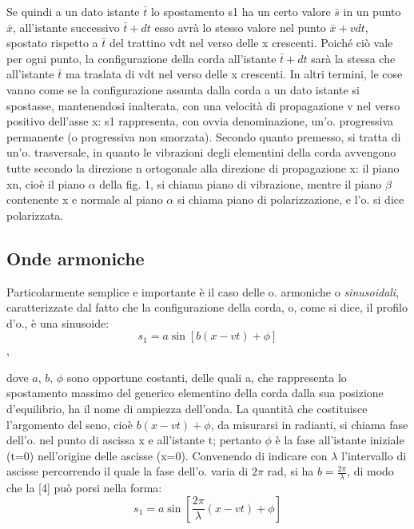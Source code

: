 \documentclass[a4paper]{article}
\begin{document}
Se quindi a un dato istante $\bar{t}$ lo spostamento s1 ha un certo valore $\bar{s}$ in un punto $\bar{x}$, all'istante successivo $\bar{t}+dt$ esso avrà lo stesso valore nel punto $\bar{x}+vdt$, spostato rispetto a $\bar{t}$ del trattino vdt nel verso delle x crescenti. Poiché ciò vale per ogni punto, la configurazione della corda all'istante $\bar{t}+dt$ sarà la stessa che all'istante $\bar{t}$ ma traslata di vdt nel verso delle x crescenti. In altri termini, le cose vanno come se la configurazione assunta dalla corda a un dato istante si spostasse, mantenendosi inalterata, con una velocità di propagazione v nel verso positivo dell'asse x: s1 rappresenta, con ovvia denominazione, un'o. progressiva permanente (o progressiva non smorzata). Secondo quanto premesso, si tratta di un'o. trasversale, in quanto le vibrazioni degli elementini della corda avvengono tutte secondo la direzione n ortogonale alla direzione di propagazione x: il piano xn, cioè il piano $\alpha$ della fig. 1, si chiama piano di vibrazione, mentre il piano $\beta$ contenente x e normale al piano $\alpha$ si chiama piano di polarizzazione, e l'o. si dice polarizzata. 

\subsection{Onde armoniche}
Particolarmente semplice e importante è il caso delle o. armoniche o \textit{sinusoidali}, caratterizzate dal fatto che la configurazione della corda, o, come si dice, il profilo d'o., è una sinusoide: 
\begin{equation}
s_1=a\sin [b(x-vt)+\phi]
\end{equation},

dove $a$, $b$, $\phi$ sono opportune costanti, delle quali a, che rappresenta lo spostamento massimo del generico elementino della corda dalla sua posizione d'equilibrio, ha il nome di ampiezza dell'onda. La quantità che costituisce l'argomento del seno, cioè $b(x-vt)+ \phi$, da misurarsi in radianti, si chiama fase dell'o. nel punto di ascissa x e all'istante t; pertanto $\phi$ è la fase all'istante iniziale (t=0) nell'origine delle ascisse (x=0). Convenendo di indicare con $\lambda$ l'intervallo di ascisse percorrendo il quale la fase dell'o. varia di $2\pi$ rad, si ha $b=\frac{2\pi}{\lambda}$, di modo che la [4] può porsi nella forma: 
\begin{equation}
s_1=a\sin [\frac{2\pi}{\lambda}(x-vt)+\phi]
\end{equation}
\end{document}
